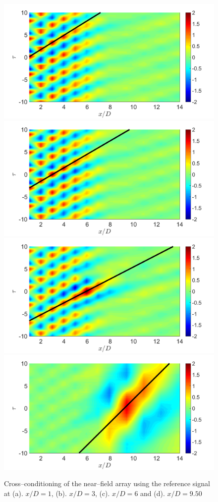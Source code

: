 \begin{figure}
	\centering
		\includegraphics[width=0.45\linewidth]{Figures/conditioning/crossCondSt0p25X1DU0p6223.png} %
		\includegraphics[width=0.45\linewidth]{Figures/conditioning/crossCondSt0p25X3DU0p6647.png}\\
		\includegraphics[width=0.45\linewidth]{Figures/conditioning/crossCondSt0p25X6DU0p7505.png} %
		\includegraphics[width=0.45\linewidth]{Figures/conditioning/crossCondSt0p25X9p5DU0p3901.png}
	\caption{Cross--conditioning of the near--field array using the reference signal at (a). $x/D = 1$, (b). $x/D=3$, (c). $x/D=6$ and (d). $x/D=9.50$}
	\label{fig:crossCondSt0p25}
\end{figure}
